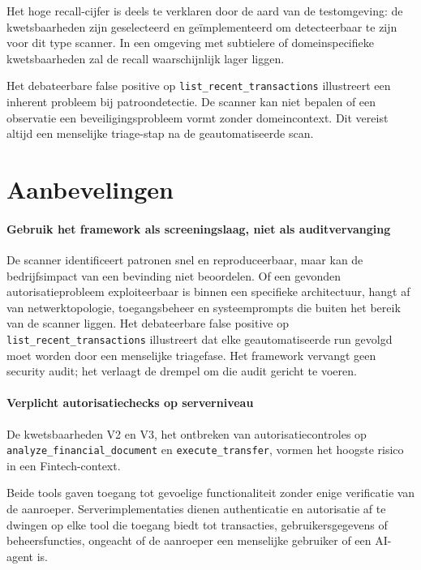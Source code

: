Het hoge recall-cijfer is deels te verklaren door de aard van de testomgeving: de kwetsbaarheden zijn geselecteerd en geïmplementeerd om detecteerbaar te zijn voor dit type scanner. In een omgeving met subtielere of domeinspecifieke kwetsbaarheden zal de recall waarschijnlijk lager liggen.

Het debateerbare false positive op \texttt{list\_recent\_transactions} illustreert een inherent probleem bij patroondetectie. De scanner kan niet bepalen of een observatie een beveiligingsprobleem vormt zonder domeincontext. Dit vereist altijd een menselijke triage-stap na de geautomatiseerde scan.

\section{Aanbevelingen}

\paragraph{Gebruik het framework als screeningslaag, niet als auditvervanging}
De scanner identificeert patronen snel en reproduceerbaar, maar kan de bedrijfsimpact van een bevinding niet beoordelen. Of een gevonden autorisatieprobleem exploiteerbaar is binnen een specifieke architectuur, hangt af van netwerktopologie, toegangsbeheer en systeemprompts die buiten het bereik van de scanner liggen. Het debateerbare false positive op \texttt{list\_recent\_transactions} illustreert dat elke geautomatiseerde run gevolgd moet worden door een menselijke triagefase. Het framework vervangt geen security audit; het verlaagt de drempel om die audit gericht te voeren.

\paragraph{Verplicht autorisatiechecks op serverniveau}
\begin{sloppypar}
De kwetsbaarheden V2 en V3, het ontbreken van autorisatiecontroles op \texttt{analyze\_financial\_document} en \texttt{execute\_transfer}, vormen het hoogste risico in een Fintech-context.
\end{sloppypar} Beide tools gaven toegang tot gevoelige functionaliteit zonder enige verificatie van de aanroeper. Serverimplementaties dienen authenticatie en autorisatie af te dwingen op elke tool die toegang biedt tot transacties, gebruikersgegevens of beheersfuncties, ongeacht of de aanroeper een menselijke gebruiker of een AI-agent is.


